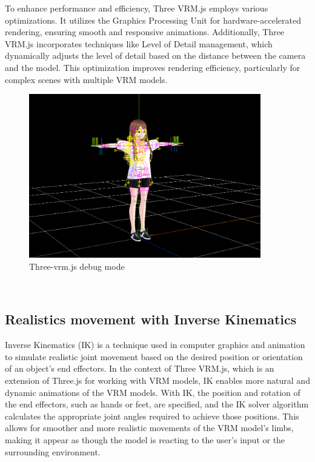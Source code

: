 To enhance performance and efficiency, Three VRM.js employs various optimizations. 
It utilizes the Graphics Processing Unit for hardware-accelerated rendering, 
ensuring smooth and responsive animations. Additionally, Three VRM.js incorporates 
techniques like Level of Detail management, which dynamically adjusts the level of detail
based on the distance between the camera and the model. This optimization improves 
rendering efficiency, particularly for complex scenes with multiple VRM models. \cite{threevrmgpu}
\\
\begin{figure}[htb]
    \centering
    \includegraphics[width=0.9\textwidth]{pics/threevrmdebug.PNG}
    \caption{Three-vrm.js debug mode}
    \label{fig:threevrmdebug}
\end{figure}
\\

\subsection{Realistics movement with Inverse Kinematics}
Inverse Kinematics (IK) is a technique used in computer graphics and animation to simulate realistic
 joint movement based on the desired position or orientation of an object's end effectors.
 In the context of Three VRM.js, which is an extension of Three.js for working with VRM models, 
 IK enables more natural and dynamic animations of the VRM models.
With IK, the position and rotation of the end effectors, such as hands or feet, are specified, and the IK 
solver algorithm calculates the appropriate joint angles required to achieve those positions. This allows for 
smoother and more realistic movements of the VRM model's limbs, making it appear as though the 
model is reacting to the user's input or the surrounding environment. \cite{whatisik}

